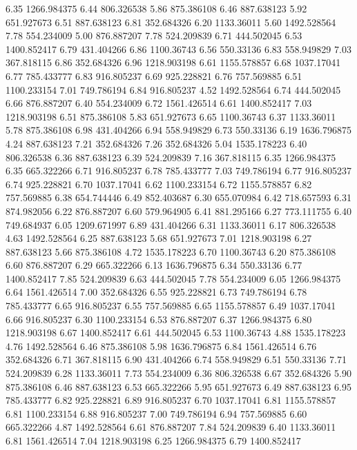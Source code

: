 6.35 	1266.984375
6.44 	806.326538
5.86 	875.386108
6.46 	887.638123
5.92 	651.927673
6.51 	887.638123
6.81 	352.684326
6.20 	1133.36011
5.60 	1492.528564
7.78 	554.234009
5.00 	876.887207
7.78 	524.209839
6.71 	444.502045
6.53 	1400.852417
6.79 	431.404266
6.86 	1100.36743
6.56 	550.33136
6.83 	558.949829
7.03 	367.818115
6.86 	352.684326
6.96 	1218.903198
6.61 	1155.578857
6.68 	1037.17041
6.77 	785.433777
6.83 	916.805237
6.69 	925.228821
6.76 	757.569885
6.51 	1100.233154
7.01 	749.786194
6.84 	916.805237
4.52 	1492.528564
6.74 	444.502045
6.66 	876.887207
6.40 	554.234009
6.72 	1561.426514
6.61 	1400.852417
7.03 	1218.903198
6.51 	875.386108
5.83 	651.927673
6.65 	1100.36743
6.37 	1133.36011
5.78 	875.386108
6.98 	431.404266
6.94 	558.949829
6.73 	550.33136
6.19 	1636.796875
4.24 	887.638123
7.21 	352.684326
7.26 	352.684326
5.04 	1535.178223
6.40 	806.326538
6.36 	887.638123
6.39 	524.209839
7.16 	367.818115
6.35 	1266.984375
6.35 	665.322266
6.71 	916.805237
6.78 	785.433777
7.03 	749.786194
6.77 	916.805237
6.74 	925.228821
6.70 	1037.17041
6.62 	1100.233154
6.72 	1155.578857
6.82 	757.569885
6.38 	654.744446
6.49 	852.403687
6.30 	655.070984
6.42 	718.657593
6.31 	874.982056
6.22 	876.887207
6.60 	579.964905
6.41 	881.295166
6.27 	773.111755
6.40 	749.684937
6.05 	1209.671997
6.89 	431.404266
6.31 	1133.36011
6.17 	806.326538
4.63 	1492.528564
6.25 	887.638123
5.68 	651.927673
7.01 	1218.903198
6.27 	887.638123
5.66 	875.386108
4.72 	1535.178223
6.70 	1100.36743
6.20 	875.386108
6.60 	876.887207
6.29 	665.322266
6.13 	1636.796875
6.34 	550.33136
6.77 	1400.852417
7.85 	524.209839
6.63 	444.502045
7.78 	554.234009
6.05 	1266.984375
6.64 	1561.426514
7.00 	352.684326
6.55 	925.228821
6.73 	749.786194
6.78 	785.433777
6.65 	916.805237
6.55 	757.569885
6.65 	1155.578857
6.49 	1037.17041
6.66 	916.805237
6.30 	1100.233154
6.53 	876.887207
6.37 	1266.984375
6.80 	1218.903198
6.67 	1400.852417
6.61 	444.502045
6.53 	1100.36743
4.88 	1535.178223
4.76 	1492.528564
6.46 	875.386108
5.98 	1636.796875
6.84 	1561.426514
6.76 	352.684326
6.71 	367.818115
6.90 	431.404266
6.74 	558.949829
6.51 	550.33136
7.71 	524.209839
6.28 	1133.36011
7.73 	554.234009
6.36 	806.326538
6.67 	352.684326
5.90 	875.386108
6.46 	887.638123
6.53 	665.322266
5.95 	651.927673
6.49 	887.638123
6.95 	785.433777
6.82 	925.228821
6.89 	916.805237
6.70 	1037.17041
6.81 	1155.578857
6.81 	1100.233154
6.88 	916.805237
7.00 	749.786194
6.94 	757.569885
6.60	665.322266
4.87	1492.528564
6.61	876.887207
7.84	524.209839
6.40	1133.36011
6.81	1561.426514
7.04	1218.903198
6.25	1266.984375
6.79	1400.852417
